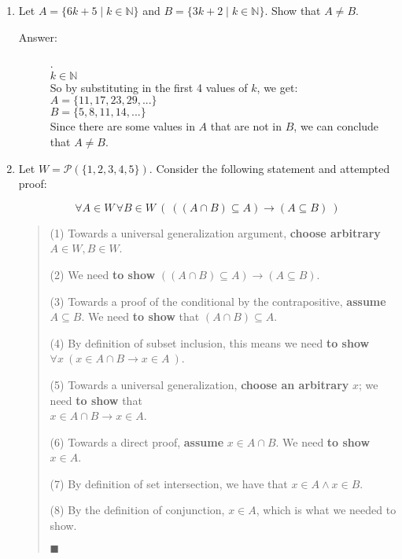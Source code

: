 \documentclass[12pt, oneside]{article}
\begin{document}
\begin{enumerate}
\item Let $A = \{6k + 5 \mid k \in \mathbb{N}\}$ and $B = \{3k + 2 \mid k \in \mathbb{N}\}$. Show that $A \neq B$.

\begin{description}
    \item[Answer:] .\\
        $k \in \mathbb{N}$\\
        So by substituting in the first 4 values of $k$, we get:\\
        $A = \{11,17,23,29,...\}$\\
        $B = \{5,8,11,14,...\}$\\
        Since there are some values in $A$ that are not in $B$, we can conclude that $A \neq B$.
\end{description}

\item Let $W = \mathcal{P}(\{1,2,3,4,5\})$. Consider the following statement and attempted proof:
\label{proof_powerset2}

$$\forall A \in W \, \forall B \in W ~\left(~((A \cap B) \subseteq A) \to (A \subseteq B)~\right)$$

\begin{quote}
(1) Towards a universal generalization argument, {\bf choose arbitrary} $A \in W, B \in W$.

(2) We need {\bf to show} $((A \cap B) \subseteq A) \to (A \subseteq B)$.

(3) Towards a proof of the conditional by the contrapositive, {\bf assume} $A \subseteq B$. We need {\bf to show} 
that $(A \cap B) \subseteq A$.

(4) By definition of subset inclusion, this means we need {\bf to show} 
$\forall x ~( x \in A \cap B \to  x \in A  ~)$.


(5) Towards a universal generalization, {\bf choose an arbitrary} $x$; we need {\bf to show} that \\
$x \in A \cap B \to x \in A$.

(6) Towards a direct proof, {\bf assume} $x \in A \cap B$. We need {\bf to show} $x \in A$.

(7) By definition of set intersection, we have that $x \in A \land x \in B$.

(8) By the definition of conjunction, $x \in A$, which is  what we needed to show.

\hfill{$\blacksquare$}

\end{quote}




\end{enumerate}
\end{document}
